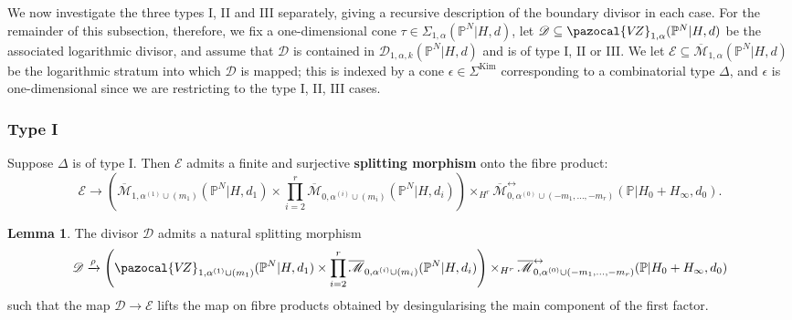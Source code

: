 \documentclass[11pt]{amsart}
\newcommand{\Kim}{\operatorname{Kim}}
\newcommand{\PP}{\mathbb P}
\newcommand{\VZ}{\pazocal{V\!Z}}
\renewcommand{\to}{\rightarrow}
\newcommand{\Mcal}{\mathcal{M}}
\newcommand{\Dcal}{\mathcal{D}}
\newcommand{\Ecal}{\mathcal{E}}
\newcommand{\ol}[1]{\overline{#1}}
\theoremstyle{definition}
\newtheorem{lemma}[thm]{Lemma}
\theoremstyle{definition}
\begin{document}
We now investigate the three types I, II and III separately, giving a recursive description of the boundary divisor in each case. For the remainder of this subsection, therefore, we fix a one-dimensional cone $\tau \in \Sigma_{1,\alpha}(\PP^N|H,d)$, let $\Dcal \subseteq \VZ_{1,\alpha}(\PP^N|H,d)$ be the associated logarithmic divisor, and assume that $\Dcal$ is contained in $\Dcal_{1,\alpha,k}(\PP^N|H,d)$ and is of type I, II or III. We let $\Ecal \subseteq \ol\Mcal_{1,\alpha}(\PP^N|H,d)$ be the logarithmic stratum into which $\Dcal$ is mapped; this is indexed by a cone $\epsilon \in \Sigma^{\Kim}$ corresponding to a combinatorial type $\Delta$, and $\epsilon$ is one-dimensional since we are restricting to the type I, II, III cases.


\subsubsection{Type I}\label{subsubsection type A} Suppose $\Delta$ is of type I. Then $\Ecal$ admits a finite and surjective \textbf{splitting morphism} onto the fibre product:
\begin{equation*} \Ecal \to \left( \ol\Mcal_{1,\alpha^{(1)}\cup(m_1)}(\PP^N|H,d_1) \times \prod_{i=2}^r \ol\Mcal_{0,\alpha^{(i)}\cup(m_i)}(\PP^N|H,d_i) \right) \times_{H^r} \ol\Mcal^{\leftrightarrow}_{0,\alpha^{(0)}\cup (-m_1,\ldots,-m_r)}(\mathbb{P}|H_0+H_\infty,d_0).\end{equation*}

\begin{lemma} \label{Lemma type A gluing} The divisor $\Dcal$ admits a natural splitting morphism
\begin{equation*}\Dcal \xrightarrow{\rho} \left(\VZ_{1,\alpha^{(1)}\cup(m_1)}(\PP^N|H,d_1)\times\prod_{i=2}^r \ol\Mcal_{0,\alpha^{(i)}\cup(m_i)}(\PP^N|H,d_i)\right) \times_{H^r} \ol\Mcal^{\leftrightarrow}_{0,\alpha^{(0)}\cup (-m_1,\ldots,-m_r)}(\mathbb{P}|H_0+H_\infty,d_0)\end{equation*}
such that the map $\Dcal \to \Ecal$ lifts the map on fibre products obtained by desingularising the main component of the first factor.\end{lemma}
\end{document}

